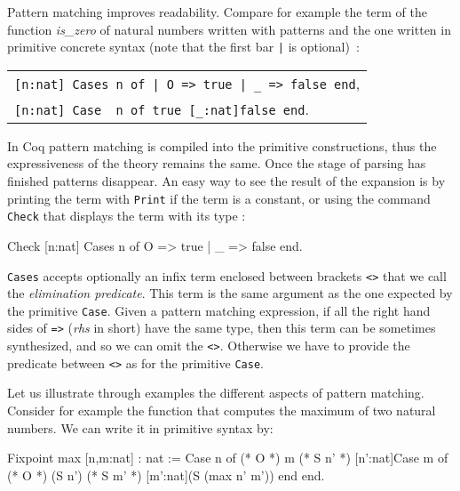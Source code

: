 Pattern matching  improves readability. Compare for example the term
of the  function {\em is\_zero} of natural 
numbers written with patterns and the one written in primitive
concrete syntax (note that the first bar \verb+|+ is optional)~:

\begin{center}
\begin{small}
\begin{tabular}{l}
\verb+[n:nat] Cases n of | O => true | _ => false end+,\\ 
\verb+[n:nat] Case  n of true [_:nat]false end+.
\end{tabular}
\end{small}
\end{center}

In Coq pattern matching is compiled into the primitive constructions,
thus the expressiveness of the theory remains the same. Once the stage
of parsing has finished patterns disappear. An easy way to see the
result of the expansion is by printing the term with \texttt{Print} if
the term is a constant, or
using the command \texttt{Check}  that displays
the term with its type :

\begin{coq_example}
Check [n:nat] Cases n of O => true | _ => false end.
\end{coq_example}


\verb+Cases+ accepts optionally an infix term enclosed between
brackets \verb+<>+ that we
call the {\em elimination predicate}. 
This term is the same argument as the one expected by the primitive
\verb+Case+. Given a pattern matching
expression, if all the right hand sides of \verb+=>+ ({\em rhs} in
short) have the same type, then this term
can be sometimes synthesized, and so we can omit the \verb+<>+.
Otherwise we have to
provide the predicate between \verb+<>+ as for the primitive \verb+Case+.

Let us illustrate through examples the different aspects of pattern matching.
Consider for example the function that computes the maximum of two
natural numbers.  We can write it in primitive syntax by:
\begin{coq_example}
Fixpoint max [n,m:nat] : nat :=
        Case n of
         (*  O   *) m
         (* S n' *) [n':nat]Case m of
                             (* O    *) (S n')
                             (* S m' *) [m':nat](S (max n' m'))
                            end
        end.
\end{coq_example}

